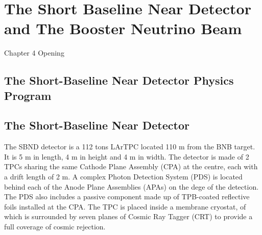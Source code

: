 \chapter{The Short Baseline Near Detector and The Booster Neutrino Beam}

\ifpdf
    \graphicspath{{Chapter4/Figs/Raster/}{Chapter4/Figs/PDF/}{Chapter4/Figs/}}
\else
    \graphicspath{{Chapter4/Figs/Vector/}{Chapter4/Figs/}}
\fi


Chapter 4 Opening

\newpage
\section{The Short-Baseline Near Detector Physics Program}





\section{The Short-Baseline Near Detector}

The SBND detector is a 112 tons LArTPC located 110 m from the BNB target.
It is 5 m in length, 4 m in height and 4 m in width.
The detector is made of 2 TPCs sharing the same Cathode Plane Assembly (CPA) at the centre, each with a drift length of 2 m.
A complex Photon Detection System (PDS) is located behind each of the Anode Plane Assemblies (APAs) on the dege of the detection.
The PDS also includes a passive component made up of TPB-coated reflective foils installed at the CPA.
The TPC is placed inside a membrane cryostat, of which is surrounded by seven planes of Cosmic Ray Tagger (CRT) to provide a full coverage of cosmic rejection.

